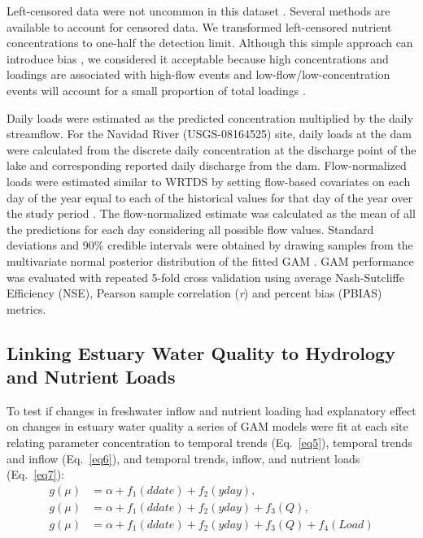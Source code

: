 \documentclass[fleqn,10pt,lineno]{wlpeerj} %
\providecommand{\DIFaddtex}[1]{{\protect\color{blue}\uwave{#1}}} %
\providecommand{\DIFaddbegin}{} %
\providecommand{\DIFaddend}{} %
\providecommand{\DIFadd}[1]{\texorpdfstring{\DIFaddtex{#1}}{#1}} %
\begin{document}
Left-censored data were not uncommon in this dataset \DIFaddbegin \DIFadd{(4\% of TP samples
and 20\% of NO\textsubscript{3} samples)}\DIFaddend . Several methods are available
to account for censored data. We transformed left-censored nutrient
concentrations to one-half the detection limit. Although this simple
approach can introduce bias
\autocite{hornungEstimationAverageConcentration1990}, we considered it
acceptable because high concentrations and loadings are associated with
high-flow events and low-flow/low-concentration events will account for
a small proportion of total loadings
\autocite{mcdowell_implications_2021}.

Daily loads were estimated as the predicted concentration multiplied by
the daily streamflow. For the Navidad River (USGS-08164525) site, daily
loads at the dam were calculated from the discrete daily concentration
at the discharge point of the lake and corresponding reported daily
discharge from the dam. Flow-normalized loads were estimated similar to
WRTDS by setting flow-based covariates on each day of the year equal to
each of the historical values for that day of the year over the study
period \autocite{hirschWeightedRegressionsTime2010}. The flow-normalized
estimate was calculated as the mean of all the predictions for each day
considering all possible flow values. Standard deviations and 90\%
credible intervals were obtained by drawing samples from the
multivariate normal posterior distribution of the fitted GAM
\autocite{woodConfidenceIntervalsGeneralized2006,marraCoveragePropertiesConfidence2012,mcdowell_implications_2021}.
GAM performance was evaluated with repeated 5-fold cross validation
\autocite{burmanComparativeStudyOrdinary1989} using average
Nash-Sutcliffe Efficiency (NSE), Pearson sample correlation (\emph{r})
and percent bias (PBIAS) metrics.

\hypertarget{linking-estuary-water-quality-to-hydrology-and-nutrient-loads}{%
\subsection*{Linking Estuary Water Quality to Hydrology and Nutrient
Loads}\label{linking-estuary-water-quality-to-hydrology-and-nutrient-loads}}

To test if changes in freshwater inflow and nutrient loading had
explanatory effect on changes in estuary water quality a series of GAM
models were fit at each site relating parameter concentration to
temporal trends (Eq.~\ref{eq5}), temporal trends and inflow
(Eq.~\ref{eq6}), and temporal trends, inflow, and nutrient loads
(Eq.~\ref{eq7}): \begin{align}
g(\mu) &= \alpha + f_1(ddate) + f_2(yday), \label{eq5} \\
g(\mu) &= \alpha + f_1(ddate) + f_2(yday) + f_3(Q), \label{eq6} \\
g(\mu) &= \alpha + f_1(ddate) + f_2(yday) + f_3(Q) + f_4(Load) \label{eq7}
\end{align}
\end{document}
